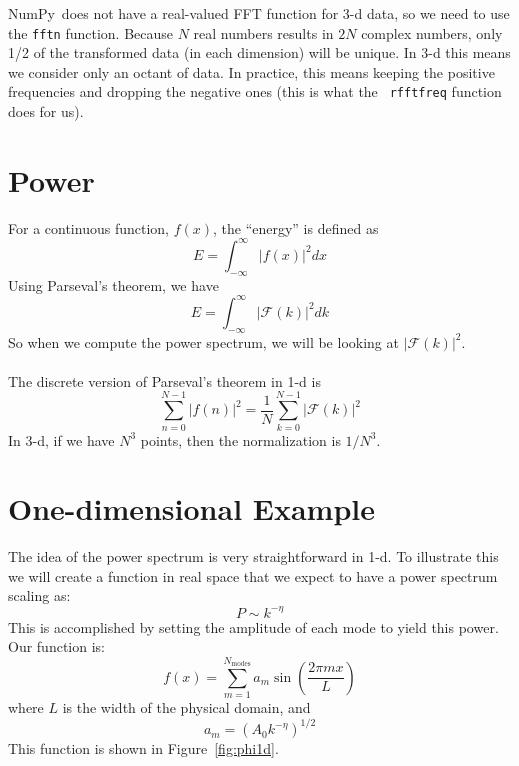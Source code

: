 \documentclass[11pt]{article}
\newcommand{\numpy}{{\sffamily NumPy}}
\begin{document}
\numpy\ does not have a real-valued FFT function for 3-d data, so we
need to use the {\tt fftn} function.  Because $N$ real numbers results
in $2N$ complex numbers, only 1/2 of the transformed data (in each
dimension) will be unique.  In 3-d this means we consider only an
octant of data.  In practice, this means keeping the positive
frequencies and dropping the negative ones (this is what the {\tt
  rfftfreq} function does for us).




\section*{Power}

For a continuous function, $f(x)$, the ``energy'' is defined as
\begin{equation}
E = \int_{-\infty}^\infty |f(x)|^2 dx
\end{equation}
Using Parseval's theorem, we have
\begin{equation}
E = \int_{-\infty}^\infty |\mathcal{F}(k)|^2 dk
\end{equation}
%
So when we compute the power spectrum, we will be looking at
$|\mathcal{F}(k)|^2$. \\

 \\

The discrete version of Parseval's theorem in 1-d is
\begin{equation}
\sum_{n=0}^{N-1} | f(n) |^2 = \frac{1}{N} \sum_{k=0}^{N-1} | \mathcal{F}(k) |^2
\end{equation}
In 3-d, if we have $N^3$ points, then the normalization is $1/N^3$.

\section*{One-dimensional Example}

The idea of the power spectrum is very straightforward in 1-d.  To illustrate
this we will create a function in real space that we expect to have a
power spectrum scaling as:
\begin{equation}
P \sim k^{-\eta}
\end{equation}
This is accomplished by setting the amplitude of each mode to yield
this power.  Our function is:
\begin{equation}
f(x) = \sum_{m=1}^{N_\mathrm{modes}} a_m \sin \left ( \frac{2\pi m x}{L}\right )
\end{equation}
where $L$ is the width of the physical domain, and 
\begin{equation}
a_m = \left (A_0 k^{-\eta} \right )^{1/2}
\end{equation}
This function is shown in Figure~\ref{fig:phi1d}.
\end{document}
